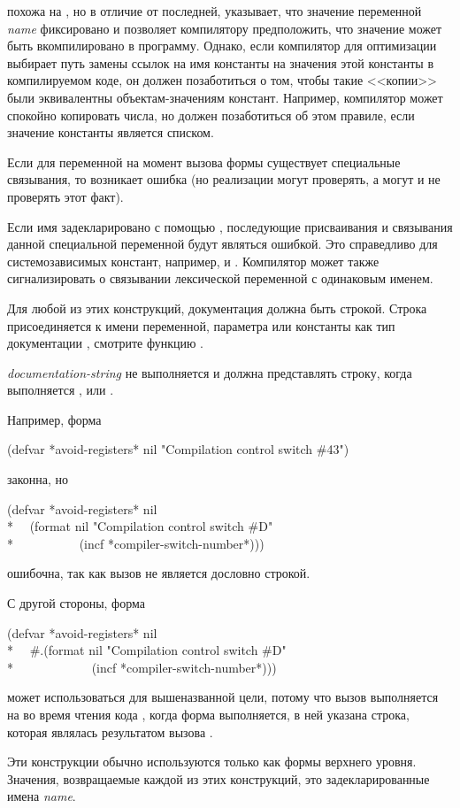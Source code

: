 \begin{defmac}
 похожа на , но в отличие от последней,
указывает, что значение переменной \emph{name} фиксировано и позволяет
компилятору предположить, что значение может быть вкомпилировано в
программу. Однако, если компилятор  для оптимизации выбирает путь замены ссылок
на имя константы на значения этой константы в компилируемом коде, он должен
позаботиться о том, чтобы такие <<копии>> были эквивалентны 
объектам-значениям констант. Например, компилятор может спокойно копировать
числа, но должен позаботиться об этом правиле, если значение константы
является списком.

Если для переменной на момент вызова формы  существует
специальные связывания, то возникает ошибка (но реализации могут проверять, а
могут и не проверять этот факт).

Если имя задекларировано с помощью ,
последующие присваивания и связывания данной специальной переменной будут
являться ошибкой. Это справедливо для системозависимых констант, например,
 и .
Компилятор может также сигнализировать о связывании лексической переменной с
одинаковым именем.

Для любой из этих конструкций, документация должна быть строкой. Строка
присоединяется к имени переменной, параметра или константы как тип документации
, смотрите функцию .

\emph{documentation-string}
не выполняется и должна представлять строку, когда выполняется ,
 или .

Например, форма
\begin{lisp}
(defvar *avoid-registers* nil "Compilation control switch \#43")
\end{lisp}
законна, но
\begin{lisp}
(defvar *avoid-registers* nil \\*
~~(format nil "Compilation control switch \#{\Xtilde}D" \\*
~~~~~~~~~~(incf *compiler-switch-number*)))
\end{lisp}
ошибочна, так как вызов  не является дословно строкой.

С другой стороны, форма
\begin{lisp}
(defvar *avoid-registers* nil \\*
~~\#.(format nil "Compilation control switch \#{\Xtilde}D" \\*
~~~~~~~~~~~~(incf *compiler-switch-number*)))
\end{lisp}
может использоваться для вышеназванной цели, потому что вызов 
выполняется на во время чтения кода , когда форма 
выполняется, в ней указана строка, которая являлась результатом вызова
.

Эти конструкции обычно используются только как формы верхнего уровня. Значения,
возвращаемые каждой из этих конструкций, это задекларированные имена \emph{name}.
\end{defmac}

